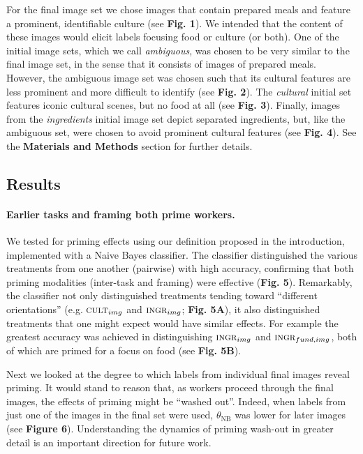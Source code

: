 \documentclass[a4paper]{report}
\begin{document}
For the final image set we chose 
images that contain prepared meals and feature a prominent, identifiable 
culture (see \textbf{Fig. 1}).  We intended that the content of these images 
would elicit labels focusing food or culture (or both).
One of the initial image sets, which we call \textit{ambiguous}, was chosen to
be very similar to the final image set, in the sense that it consists of
images of prepared meals.  However, the ambiguous image set was chosen such 
that its cultural features are less prominent and more difficult to identify 
(see \textbf{Fig. 2}).  
The \textit{cultural} initial set features iconic cultural scenes, but no food 
at all (see \textbf{Fig. 3}).  Finally, images from
the \textit{ingredients} initial image set depict separated ingredients, but, 
like the ambiguous set, were chosen to avoid prominent cultural features (see 
\textbf{Fig. 4}).  See the \textbf{Materials and Methods} section for further 
details.

\subsection*{Results}
\paragraph{Earlier tasks and framing both prime workers.}
We tested for priming effects using our definition proposed in the 
introduction, implemented with a Naive Bayes classifier.  
The classifier distinguished the various treatments from one another (pairwise)
with high accuracy, confirming that both priming modalities 
(inter-task and framing) were effective (\textbf{Fig. 5}).  Remarkably, the 
classifier not only 
distinguished treatments tending toward ``different orientations'' 
(e.g. $\textsc{cult}_{img}$ and $\textsc{ingr}_{img}$; \textbf{Fig. 5A}), 
it also distinguished treatments that one might expect would have similar
effects.  For example the greatest accuracy was achieved in 
distinguishing $\textsc{ingr}_{img}$ and $\textsc{ingr}_{fund, img}$, both
of which are primed for a focus on food 
(see \textbf{Fig. 5B}).

Next we looked at the degree to which labels from individual final images 
reveal priming.  It would stand to reason that, as workers proceed through 
the final images, the effects of priming might be ``washed out''.  
Indeed, when labels from just one of the images
in the final set were used, $\theta_\text{NB}$ was lower for later images (see
\textbf{Figure 6}).
Understanding the dynamics of priming wash-out in greater detail is an 
important direction for future work.
\end{document}
